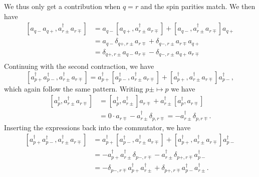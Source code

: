 We thus only get a contribution when $q = r$ and the spin parities match.
We then have
\begin{align*}
    \left[ a_{q-} a_{q+}, a^\dag_{r\pm} a_{r\mp} \right]
    &= a_{q-} \left[ a_{q+}, a^\dag_{r\pm} a_{r\mp} \right] + \left[ a_{q-}, a^\dag_{r\pm} a_{r\mp} \right] a_{q+} \\
    &= a_{q-} \delta_{q+, r\pm} a_{r\mp} + \delta_{q-, r\pm} a_{r\mp} a_{q+} \\
    &= \delta_{q+, r\pm} a_{q-} a_{r\mp} - \delta_{q-, r\pm} a_{q+} a_{r\mp} \\
\end{align*}
Continuing with the second contraction, we have
\begin{equation*}
    \left[ a_{p+}^\dagger a_{p-}^\dagger, a^\dag_{r\pm} a_{r\mp} \right] = a_{p+}^\dagger \left[ a_{p-}^\dagger, a^\dag_{r\pm} a_{r\mp} \right] + \left[ a_{p+}^\dagger, a^\dag_{r\pm} a_{r\mp} \right] a_{p-}^\dagger,
\end{equation*}
which again follow the same pattern.
Writing $p \pm \mapsto p$ we have
\begin{align*}
    \left[ a_{p}^\dagger, a^\dag_{r\pm} a_{r\mp} \right]
    &= \left[ a_p^\dagger, a^\dag_{r\pm} \right] a_{r\mp} + a^\dag_{r\pm} \left[ a_p^\dagger, a_{r\mp} \right] \\
    &= 0 \cdot a_{r\mp} - a^\dag_{r\pm} \delta_{p, r\mp} = - a^\dag_{r\pm} \delta_{p, r\mp}.
\end{align*}
Inserting the expressions back into the commutator, we have
\begin{align*}
    \left[ a_{p+}^\dagger a_{p-}^\dagger, a^\dag_{r\pm} a_{r\mp} \right]
    &= a_{p+}^\dagger \left[ a_{p-}^\dagger, a^\dag_{r\pm} a_{r\mp} \right] + \left[ a_{p+}^\dagger, a^\dag_{r\pm} a_{r\mp} \right] a_{p-}^\dagger \\
    &= - a_{p+}^\dagger a^\dag_{r\pm} \delta_{p-, r\mp} - a^\dag_{r\pm} \delta_{p+, r\mp} a_{p-}^\dagger \\
    &= - \delta_{p-, r\mp} a_{p+}^\dagger a^\dag_{r\pm} + \delta_{p+, r\mp} a_{p-}^\dagger a^\dag_{r\pm}.
\end{align*}

